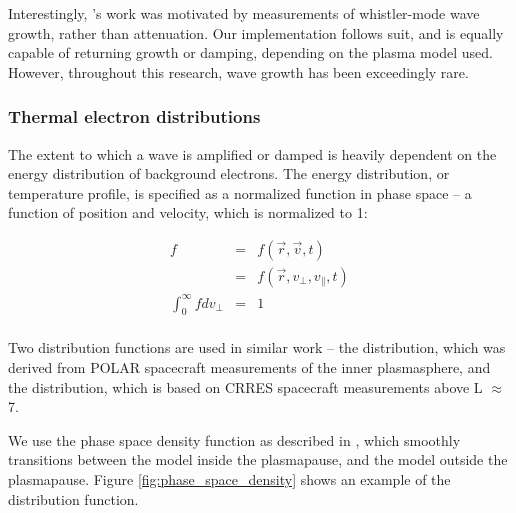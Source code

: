 Interestingly, \citeauthor{Brinca1972}'s work was motivated by measurements of whistler-mode wave growth, rather than attenuation. Our implementation follows suit, and is equally capable of returning growth or damping, depending on the plasma model used. However, throughout this research, wave growth has been exceedingly rare.

\subsubsection{Thermal electron distributions}
\label{section:thermal_electron_distributions}
The extent to which a wave is amplified or damped is heavily dependent on the energy distribution of background electrons. The energy distribution, or temperature profile, is specified as a normalized function in phase space -- a function of position and velocity, which is normalized to 1:

\begin{eqnarray}
f  & = & f(\vec{r}, \vec{v}, t) \\
& =  & f(\vec{r}, v_\perp, v_\parallel, t) \\
\int_0^\infty f d v_\perp & = & 1 \\
\end{eqnarray}

Two distribution functions are used in similar work -- the \cite{Bell2002} distribution, which was derived from POLAR spacecraft measurements of the inner plasmasphere, and the \cite{Bortnik2007} distribution, which is based on CRRES spacecraft measurements above L $\approx$ 7.

We use the phase space density function as described in \cite{Golden2010}, which smoothly transitions between the \cite{Bell2002} model inside the plasmapause, and the \cite{Bortnik2007} model outside the plasmapause. Figure \ref{fig:phase_space_density} shows an example of the distribution function.

